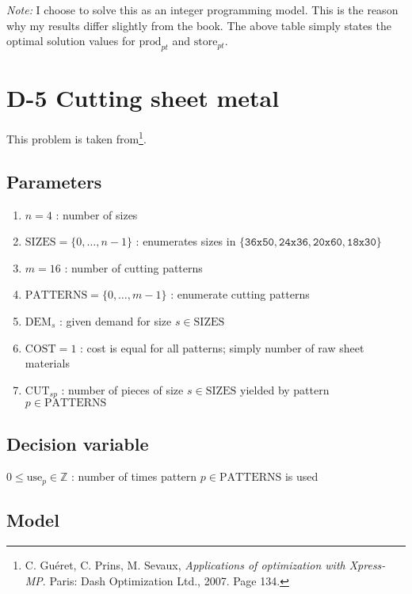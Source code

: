 \documentclass[8pt,oneside]{extarticle}
\newcommand{\Int}{\mathbb{Z}}
\begin{document}
\emph{Note:} I choose to solve this as an integer programming model. This is
the reason why my results differ slightly from the book. The above table simply states the optimal
solution values for $\mathrm{prod}_{pt}$ and $\mathrm{store}_{pt}$.

\newpage

\section{D-5 Cutting sheet metal}

This problem is taken from\footnote{C. Guéret, C. Prins, M. Sevaux, \textit{Applications of optimization with Xpress-MP}. %
Paris: Dash Optimization Ltd., 2007. Page 134.}.

\subsection{Parameters}

\begin{enumerate}

    \item $n=4$ : number of sizes
    \item $\mathrm{SIZES} =\lbrace 0,\ldots, n-1\rbrace$ : enumerates sizes in $\lbrace \texttt{36x50}, \texttt{24x36}, \texttt{20x60}, \texttt{18x30}\rbrace$
    \item $m = 16$ : number of cutting patterns
    \item $\mathrm{PATTERNS} = \lbrace 0,\ldots,m-1\rbrace$ : enumerate cutting patterns
    \item $\mathrm{DEM}_s$ : given demand for size $s\in\mathrm{SIZES}$
    \item $\mathrm{COST} = 1$ : cost is equal for all patterns; simply number of raw sheet materials
    \item $\mathrm{CUT}_{sp}$ : number of pieces of size $s\in\mathrm{SIZES}$ yielded by pattern $p\in\mathrm{PATTERNS}$
\end{enumerate}

\subsection{Decision variable}

$0 \leq \mathrm{use}_p \in\Int$ : number of times pattern $p\in\mathrm{PATTERNS}$ is used

\subsection{Model}
\end{document}
